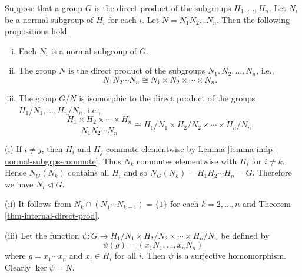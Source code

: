 \begin{proposition} \label{prop-direct-product-normal-subgrp}
	Suppose that a group $G$ is the  direct product of the subgroups $H_1, \dots, H_n$. Let $N_i$ be a normal subgroup of $H_i$ for each $i$. Let $N = N_1 N_2 \dots N_n$. Then the following propositions hold.
	\begin{enumerate}[(i)]
		\item Each $N_i$ is a normal subgroup of $G$.
		\item The group $N$ is the direct product of the subgroups $N_1, N_2, \dots, N_n$, i.e.,
		\begin{equation*}
			N_1N_2\cdots N_n \cong N_1\times N_2\times \cdots \times N_n.
		\end{equation*}
		\item The group $G/N$ is isomorphic to the direct product of the groups $H_1/N_1, \dots, H_n/N_n$, i.e.,
		\begin{equation*}
			\frac{H_1\times H_2\times \cdots \times H_n}{N_1N_2\cdots N_n} \cong H_1/N_1\times H_2/N_2\times  \cdots \times H_n/N_n.
		\end{equation*}
	\end{enumerate}
\end{proposition}
\begin{sketch}
	(i) If $i \ne j$, then $H_i$ and $H_j$ commute elementwise by Lemma \ref{lemma-indp-normal-subgrps-commute}. Thus $N_k$ commutes elementwise with $H_i$ for $i\neq k$. Hence $N_G(N_k)$ contains all $H_i$ and so $N_G(N_k) = H_1H_2\cdots H_n = G$. Therefore we have $N_i \lhd G$.
	
	(ii) It follows from $N_k \cap (N_1\cdots N_{k-1}) = \{1\}$ for each $k=2,\dots, n$ and Theorem \ref{thm-internal-direct-prod}.
	
	(iii)  Let the function $\psi:G\rightarrow H_1/N_1\times H_2/N_2\times  \cdots \times H_n/N_n$ be defined by
	\begin{equation*}
		\psi(g) =  (x_1N_1, \ldots, x_nN_n)
	\end{equation*}
	where $g = x_1\cdots x_n$ and $x_i\in H_i$ for all $i$. Then $\psi$ is a surjective homomorphism. Clearly $\ker \psi = N$.
\end{sketch}

